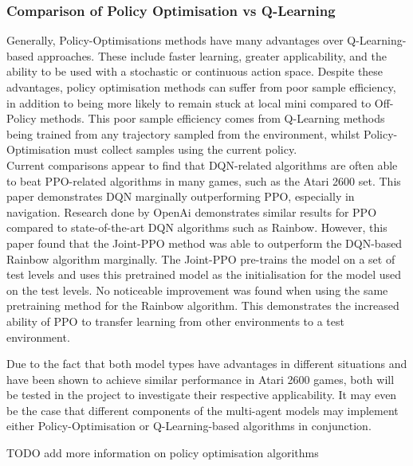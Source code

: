 \documentclass{article}
\begin{document}


\subsubsection{Comparison of Policy Optimisation vs Q-Learning}

Generally, Policy-Optimisations methods have many advantages over Q-Learning-based approaches. These include faster learning, greater applicability, and the ability to be used with a stochastic or continuous action space\cite{NachumBridgingLearning}. Despite these advantages, policy optimisation methods can suffer from poor sample efficiency\cite{NachumBridgingLearning}, in addition to being more likely to remain stuck at local mini compared to Off-Policy methods. This poor sample efficiency comes from Q-Learning methods being trained from any trajectory sampled from the environment, whilst Policy-Optimisation must collect samples using the current policy. 
\\ 
Current comparisons appear to find that DQN-related algorithms are often able to beat PPO-related algorithms in many games, such as the Atari 2600 set. This paper\cite{Zakharenkov2021DeepVizDoom} demonstrates DQN marginally outperforming PPO, especially in navigation. Research done by OpenAi demonstrates similar results for PPO compared to state-of-the-art DQN algorithms such as Rainbow\cite{NicholGottaRL}. However, this paper found that the Joint-PPO method was able to outperform the DQN-based Rainbow algorithm marginally. The Joint-PPO pre-trains the model on a set of test levels and uses this pretrained model as the initialisation for the model used on the test levels. No noticeable improvement was found when using the same pretraining method for the Rainbow algorithm. This demonstrates the increased ability of PPO to transfer learning from other environments to a test environment. 

Due to the fact that both model types have advantages in different situations and have been shown to achieve similar performance in Atari 2600 games, both will be tested in the project to investigate their respective applicability. It may even be the case that different components of the multi-agent models may implement either Policy-Optimisation or Q-Learning-based algorithms in conjunction. 

TODO add more information on policy optimisation algorithms

\end{document}
